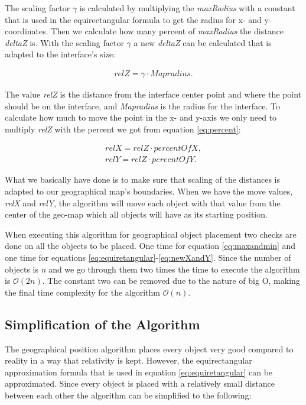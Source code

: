 The scaling factor \textit{$\gamma$} is calculated by multiplying the \textit{maxRadius} with a constant that is used in the equirectangular formula to get the radius for x- and y-coordinates. Then we calculate how many percent of \textit{maxRadius} the distance \textit{deltaZ} is. With the scaling factor \textit{$\gamma$} a new \textit{deltaZ} can be calculated that is adapted to the interface's size:

\begin{align}
\label{eq:newZ}
relZ = \gamma \cdot Mapradius.
\end{align}

The value \textit{relZ} is the distance from the interface center point and where the point should be on the interface, and \textit{Mapradius} is the radius for the interface. To calculate how much to move the point in the x- and y-axis we only need to multiply \textit{relZ} with the percent we got from equation \ref{eq:percent}:

\begin{align}
\label{eq:newXandY}
relX = relZ \cdot percentOfX, \\
relY = relZ \cdot perecntOfY. \nonumber
\end{align}

What we basically have done is to make sure that scaling of the distances is adapted to our geographical map's boundaries. When we have the move values, \textit{relX} and \textit{relY}, the algorithm will move each object with that value from the center of the geo-map which all objects will have as its starting position. 

When executing this algorithm for geographical object placement two checks are done on all the objects to be placed. One time for equation \ref{eq:maxandmin} and one time for equations \ref{eq:equiretangular}-\ref{eq:newXandY}. Since the number of objects is \textit{n} and we go through them two times the time to execute the algorithm is $\mathcal{O}(2n)$. The constant two can be removed due to the nature of big O, making the final time complexity for the algorithm $\mathcal{O}(n)$.



\subsection{Simplification of the Algorithm}
\label{sec:limacc}

The geographical position algorithm places every object very good compared to reality in a way that relativity is kept. However, the equirectangular approximation formula that is used in equation \ref{eq:equiretangular} can be approximated. Since every object is placed with a relatively small distance between each other the algorithm can be simplified to the following: 

